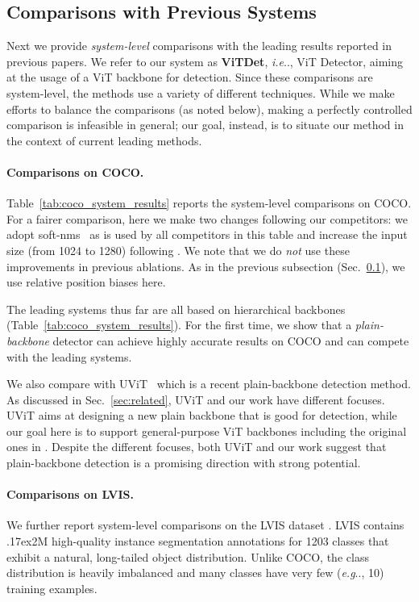 \documentclass[runningheads]{llncs}
\makeatletter
\newcommand{\app}{\raise.17ex\hbox{}}
\DeclareRobustCommand\onedot{\futurelet\@let@token\@onedot}
\def\@onedot{\ifx\@let@token.\else.\null\fi\xspace}
\def\eg{\emph{e.g}\onedot} \def\Eg{\emph{E.g}\onedot}
\def\ie{\emph{i.e}\onedot} \def\Ie{\emph{I.e}\onedot}
\makeatother
\begin{document}
\subsection{Comparisons with Previous Systems} \label{subsec:vs_prev}

Next we provide \textit{system-level} comparisons with the leading results reported in previous papers. We refer to our system as \textbf{ViTDet}, \ie, ViT Detector, aiming at the usage of a ViT backbone for detection. Since these comparisons are system-level, the methods use a variety of different techniques. While we make efforts to balance the comparisons (as noted below), making a perfectly controlled comparison is infeasible in general; our goal, instead, is to situate our method in the context of current leading methods.

\paragraph{Comparisons on COCO.} Table~\ref{tab:coco_system_results} reports the system-level comparisons on COCO.
For a fairer comparison, here we make two changes following our competitors: we adopt soft-nms~\cite{Bodla2017} as is used by all competitors \cite{Liu2021,Li2021a,Liang2021,Liu2021a} in this table and increase the input size (from 1024 to 1280) following \cite{Liang2021,Liu2021a}. We note that we do \textit{not} use these improvements in previous ablations. As in the previous subsection (Sec.~\ref{subsec:vs_prev}), we use relative position biases here.

The leading systems thus far are all based on hierarchical backbones (Table~\ref{tab:coco_system_results}). For the first time, we show that a \textit{plain-backbone} detector can achieve highly accurate results on COCO and can compete with the leading systems.

We also compare with UViT~\cite{Chen2021b} which is a recent plain-backbone detection method. As discussed in Sec.~\ref{sec:related}, UViT and our work have different focuses. UViT aims at designing a new plain backbone that is good for detection, while our goal here is to support general-purpose ViT backbones including the original ones in \cite{Dosovitskiy2021}.
Despite the different focuses, both UViT and our work suggest that plain-backbone detection is a promising direction with strong potential.

\paragraph{Comparisons on LVIS.} We further report system-level comparisons on the LVIS dataset \cite{Gupta2019}. LVIS contains \app2M high-quality instance segmentation annotations for 1203 classes that exhibit a natural, long-tailed object distribution. Unlike COCO, the class distribution is heavily imbalanced and many classes have very few (\eg, 10) training examples.
\end{document}
